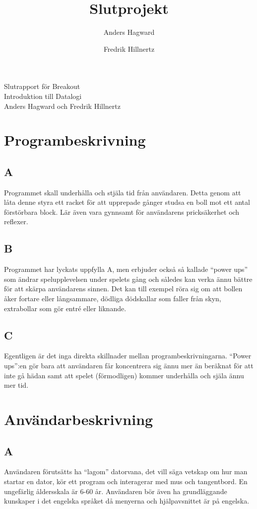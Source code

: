 \documentclass[11pt,a4paper]{article}
\author{Anders Hagward \and Fredrik Hillnertz}
\title{Slutprojekt}
\begin{document}
\thispagestyle{empty}
\begin{center}
\Huge Slutrapport för Breakout \\
\Large Introduktion till Datalogi \\
\normalsize Anders Hagward och Fredrik Hillnertz
\end{center}
\newpage

\tableofcontents
\newpage

\section{Programbeskrivning}

\subsection{A}
Programmet skall underhålla och stjäla tid från användaren. Detta genom att låta denne styra ett racket för att upprepade gånger studsa en boll mot ett antal förstörbara block. Lär även vara gynnsamt för användarens pricksäkerhet och reflexer.

\subsection{B}
Programmet har lyckats uppfylla A, men erbjuder också så kallade ``power ups'' som ändrar spelupplevelsen under spelets gång och således kan verka ännu bättre för att skärpa användarens sinnen. Det kan till exempel röra sig om att bollen åker fortare eller långsammare, dödliga dödskallar som faller från skyn, extrabollar som gör entré eller liknande.

\subsection{C}
Egentligen är det inga direkta skillnader mellan programbeskrivningarna. ``Power ups'':en gör bara att användaren får koncentrera sig ännu mer än beräknat för att inte gå hädan samt att spelet (förmodligen) kommer underhålla och själa ännu mer tid.

\section{Användarbeskrivning}

\subsection{A}
Användaren förutsätts ha ``lagom'' datorvana, det vill säga vetskap om hur man startar en dator, kör ett program och interagerar med mus och tangentbord. En ungefärlig åldersskala är 6-60 år. Användaren bör även ha grundläggande kunskaper i det engelska språket då menyerna och hjälpavsnittet är på engelska.
\end{document}

